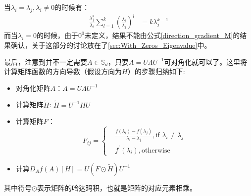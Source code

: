 当$\lambda_{i}=\lambda_{j},\lambda_{i} \neq 0$的时候有：
\begin{equation}
\label{Compute_Zij_2}
\begin{split}
\frac{\lambda_{j}^{k}}{\lambda_{i}}\sum_{l=1}^{k}\left(\frac{\lambda_i}{\lambda_j}\right)^{l}&=k\lambda_{j}^{k-1}
\end{split}
\end{equation}
而当$\lambda_{i}=0$的时候，由于$0^{0}$未定义，结果不能由公式\ref{direction_gradient_M}的结果确认，关于这部分的讨论放在了\ref{sec:With_Zeros_Eigenvalue}中。

最后，注意到并不一定需要$A\in \mathbb{S}_{d}$，只要$A=U\Lambda U^{-1}$可对角化就可以了。这里将计算矩阵函数的方向导数（假设方向为$H$）的步骤归纳如下:
\begin{itemize}
\label{Compute_direct}
\item 对角化矩阵$A$：$A=U\Lambda U^{-1}$
\item 计算矩阵$\tilde{H}$: $\tilde{H}=U^{-1}HU$
\item 计算矩阵$F$：
\begin{equation}
\label{Compute_F}
F_{ij}=\left\{
\begin{split}
&\frac{f(\lambda_i)-f(\lambda_j)}{\lambda_i-\lambda_j},\text{if $\lambda_i \neq \lambda_j$}\\
&f^{\prime}(\lambda_{i}),\text{otherwise}
\end{split}
\right.
\end{equation}
\item 计算$D_{A}f(A)[H]=U(F\odot\tilde{H})U^{-1}$
\end{itemize}
其中符号$\odot$表示矩阵的哈达玛积，也就是矩阵的对应元素相乘。
